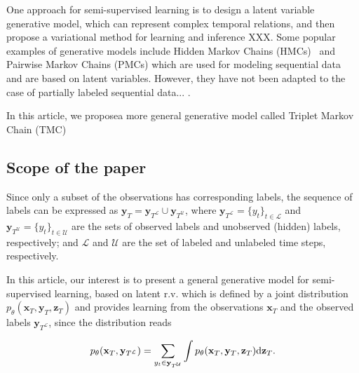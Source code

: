 \documentclass{article}
\def\x{{\mathbf x}}
\def\z{{\mathbf z}}
\def\y{{\mathbf y}}
\def\yl{{\mathbf y}_{T^{\mathcal{L}}}}
\def\yu{{\mathbf y}_{T^{\mathcal{U}}}}
\def\L{{\mathcal L}}
\def\p{p_{\theta}}
\def\L{\mathcal{L}}
\def\U{\mathcal{U}}
\newcommand{\observation}[1]{\todo[size=\tiny,color=orange]{#1  \hfill --- obs}}
\begin{document}
One approach for semi-supervised learning is to design a latent variable 
generative model, which can represent complex temporal relations, 
and then propose a variational method for learning and inference XXX. 
Some popular examples of generative models  include 
Hidden Markov Chains (HMCs)~\cite{rabiner1989tutorial} and  Pairwise Markov
Chains (PMCs) \cite{morales2021variational,wp-pami} which are used for modeling sequential data and 
are based on latent variables.
However, they have not been adapted to the case of partially labeled 
sequential data... \observation{I'm not sure}. 

In this article, we proposea more general generative model called 
Triplet Markov Chain (TMC)~\cite{wp-cras-chaines3,pieczynski2005triplet} 





\subsection{Scope of the paper}

Since  only a subset of the observations has corresponding labels,  
the sequence of labels can be expressed as  $\y_T  = \yl \cup \yu$,  
where  $\yl = \{y_t\}_{t\in \L}$  and $\yu = \{y_t\}_{t\in \U}$ are the sets
of observed labels and unobserved (hidden) labels, respectively; and $\mathcal{L}$ and 
$\mathcal{U}$ are the set of labeled and unlabeled time steps, respectively. 



In this article, our interest is to present a general generative model for 
semi-supervised learning,  based on latent r.v. which is defined by a joint 
distribution $\p(\x_T, \y_T, \z_T)$ and provides learning from the observations 
$\x_T$ and the observed labels $\yl$,  since the distribution reads 

\begin{align}
    \label{eq:jointTMC}
    \p(\x_T, \yl) =  \sum_{y_t\in \yu} \int  \p(\x_T, \y_T,\z_T) {\rm d}\z_T \text{.}
\end{align}
\end{document}
